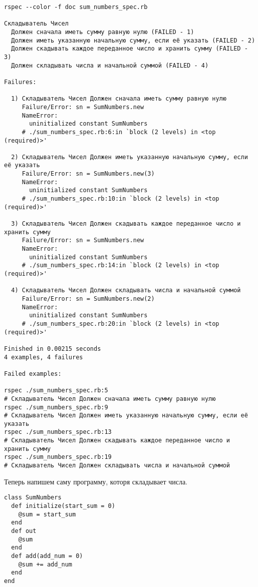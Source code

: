 \begin{verbatim}
rspec --color -f doc sum_numbers_spec.rb 

Складыватель Чисел
  Должен сначала иметь сумму равную нулю (FAILED - 1)
  Должен иметь указанную начальную сумму, если её указать (FAILED - 2)
  Должен скадывать каждое переданное число и хранить сумму (FAILED - 3)
  Должен складывать числа и начальной суммой (FAILED - 4)

Failures:

  1) Складыватель Чисел Должен сначала иметь сумму равную нулю
     Failure/Error: sn = SumNumbers.new
     NameError:
       uninitialized constant SumNumbers
     # ./sum_numbers_spec.rb:6:in `block (2 levels) in <top (required)>'

  2) Складыватель Чисел Должен иметь указанную начальную сумму, если её указать
     Failure/Error: sn = SumNumbers.new(3)
     NameError:
       uninitialized constant SumNumbers
     # ./sum_numbers_spec.rb:10:in `block (2 levels) in <top (required)>'

  3) Складыватель Чисел Должен скадывать каждое переданное число и хранить сумму
     Failure/Error: sn = SumNumbers.new
     NameError:
       uninitialized constant SumNumbers
     # ./sum_numbers_spec.rb:14:in `block (2 levels) in <top (required)>'

  4) Складыватель Чисел Должен складывать числа и начальной суммой
     Failure/Error: sn = SumNumbers.new(2)
     NameError:
       uninitialized constant SumNumbers
     # ./sum_numbers_spec.rb:20:in `block (2 levels) in <top (required)>'

Finished in 0.00215 seconds
4 examples, 4 failures

Failed examples:

rspec ./sum_numbers_spec.rb:5
# Складыватель Чисел Должен сначала иметь сумму равную нулю
rspec ./sum_numbers_spec.rb:9
# Складыватель Чисел Должен иметь указанную начальную сумму, если её указать
rspec ./sum_numbers_spec.rb:13
# Складыватель Чисел Должен скадывать каждое переданное число и хранить сумму
rspec ./sum_numbers_spec.rb:19
# Складыватель Чисел Должен складывать числа и начальной суммой
\end{verbatim}

Теперь напишем саму программу, которя складывает числа.

\begin{verbatim}
class SumNumbers
  def initialize(start_sum = 0)
    @sum = start_sum
  end
  def out
    @sum
  end
  def add(add_num = 0)
    @sum += add_num
  end
end
\end{verbatim}

